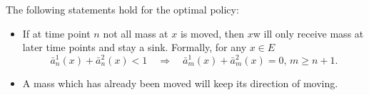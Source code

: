\documentclass[10pt,a4paper]{amsart}
\begin{document}
\begin{theorem}\label{theo:OT}
The following statements hold  for the optimal policy:
\begin{itemize}
\item[a)] If at time point $n$  not all mass 
at $x$ is moved, then $x$w ill only receive 
mass at later time points and stay a sink.
Formally, for any $x\in E$  
$$ \bar a_n^1(x)+\bar a_n^2(x)< 1 \quad \Rightarrow\quad \bar a_m^1(x)+\bar a_m^2(x)=0,\, m\ge  n+1. $$
\item[b)]  A mass which has already been moved 
will keep its direction of moving.
    \end{itemize}
\end{theorem}
\end{document}
